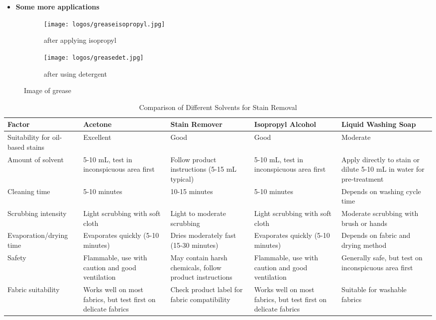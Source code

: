 \documentclass[table]{rapportCS}
\begin{document}
\begin{itemize}[label=$\bullet$]
        \item \textbf{Some more applications} 
    \end{itemize}

\begin{figure}
    \centering
    \begin{subfigure}{0.1\textwidth}
        \centering
        \texttt{[image: logos/greaseisopropyl.jpg]}
        \caption{ after applying isopropyl}
    \end{subfigure}\hspace{0.1\textwidth}%
    \begin{subfigure}{0.1\textwidth}
        \centering
        \texttt{[image: logos/greasedet.jpg]}
        \caption{after using detergent }
    \end{subfigure}
    \caption{Image of grease}
\end{figure}
\begin{table}[h]
    \centering
    \begin{tabular}{|p{3cm}|p{3cm}|p{3cm}|p{3cm}|p{3cm}|}
        \toprule
        \hline
        \textbf{Factor} & \textbf{Acetone} & \textbf{Stain Remover} & \textbf{Isopropyl Alcohol} & \textbf{Liquid Washing Soap} \\
        \midrule
        \hline
        Suitability for oil-based stains & Excellent & Good & Good & Moderate \\
        Amount of solvent & 5-10 mL, test in inconspicuous area first & Follow product instructions (5-15 mL typical) & 5-10 mL, test in inconspicuous area first & Apply directly to stain or dilute 5-10 mL in water for pre-treatment \\
        \hline
        Cleaning time & 5-10 minutes & 10-15 minutes & 5-10 minutes & Depends on washing cycle time \\
        \hline
        Scrubbing intensity & Light scrubbing with soft cloth & Light to moderate scrubbing & Light scrubbing with soft cloth & Moderate scrubbing with brush or hands \\
        \hline
        Evaporation/drying time & Evaporates quickly (5-10 minutes) & Dries moderately fast (15-30 minutes) & Evaporates quickly (5-10 minutes) & Depends on fabric and drying method \\
        \hline
        Safety & Flammable, use with caution and good ventilation & May contain harsh chemicals, follow product instructions & Flammable, use with caution and good ventilation & Generally safe, but test on inconspicuous area first \\
        \hline
        Fabric suitability & Works well on most fabrics, but test first on delicate fabrics & Check product label for fabric compatibility & Works well on most fabrics, but test first on delicate fabrics & Suitable for washable fabrics \\
        \hline
        \bottomrule
    \end{tabular}
    \caption{Comparison of Different Solvents for Stain Removal}
    \label{tab:solvent_comparison}
\end{table}
\clearpage
\end{document}
